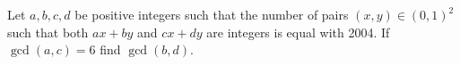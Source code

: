 Let $a,b,c,d$ be positive integers such that the number of pairs $(x,y) \in (0,1)^2$ such that both $ax+by$ and $cx+dy$ are integers is equal with 2004. If $\gcd (a,c)=6$ find $\gcd (b,d)$.